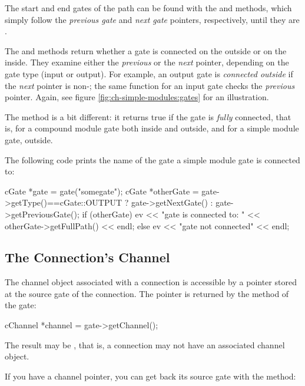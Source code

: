 The start and end gates of the path can be found with the 
and  methods, which simply follow the \textit{previous gate} and
\textit{next gate} pointers, respectively, until they are .

The  and  methods
return whether a gate is connected on the outside or on the inside. They
examine either the \textit{previous} or the \textit{next} pointer, depending on the
gate type (input or output). For example, an output gate is \textit{connected outside}
if the \textit{next} pointer is non-; the same function for an input gate
checks the \textit{previous} pointer. Again, see figure \ref{fig:ch-simple-modules:gates}
for an illustration.

The  method is a bit different: it returns true if the gate
is \textit{fully} connected, that is, for a compound module gate
both inside and outside, and for a simple module gate, outside.

The following code prints the name of the gate a simple module gate is
connected to:

\begin{cpp}
cGate *gate = gate("somegate");
cGate *otherGate = gate->getType()==cGate::OUTPUT ? gate->getNextGate() :
                                                    gate->getPreviousGate();
if (otherGate)
  ev << "gate is connected to: " << otherGate->getFullPath() << endl;
else
  ev << "gate not connected" << endl;
\end{cpp}


\subsection{The Connection's Channel}

The channel object associated with a connection is accessible by
a pointer stored at the source gate of the connection. The pointer
is returned by the  method of the gate:

\begin{cpp}
cChannel *channel = gate->getChannel();
\end{cpp}

The result may be , that is, a connection may not have
an associated channel object.

If you have a channel pointer, you can get back its source gate
with the  method:

